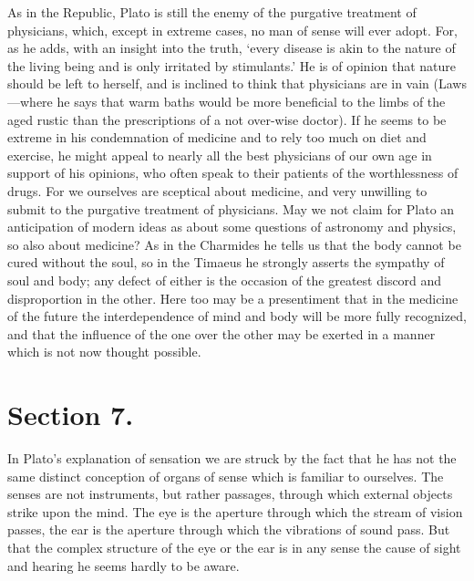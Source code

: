 \documentclass[11pt,letter]{article}
\begin{document}
\par  As in the Republic, Plato is still the enemy of the purgative treatment of physicians, which, except in extreme cases, no man of sense will ever adopt. For, as he adds, with an insight into the truth, ‘every disease is akin to the nature of the living being and is only irritated by stimulants.’ He is of opinion that nature should be left to herself, and is inclined to think that physicians are in vain (Laws—where he says that warm baths would be more beneficial to the limbs of the aged rustic than the prescriptions of a not over-wise doctor). If he seems to be extreme in his condemnation of medicine and to rely too much on diet and exercise, he might appeal to nearly all the best physicians of our own age in support of his opinions, who often speak to their patients of the worthlessness of drugs. For we ourselves are sceptical about medicine, and very unwilling to submit to the purgative treatment of physicians. May we not claim for Plato an anticipation of modern ideas as about some questions of astronomy and physics, so also about medicine? As in the Charmides he tells us that the body cannot be cured without the soul, so in the Timaeus he strongly asserts the sympathy of soul and body; any defect of either is the occasion of the greatest discord and disproportion in the other. Here too may be a presentiment that in the medicine of the future the interdependence of mind and body will be more fully recognized, and that the influence of the one over the other may be exerted in a manner which is not now thought possible.

\par 
\section{
      Section 7.
    }
\par  In Plato’s explanation of sensation we are struck by the fact that he has not the same distinct conception of organs of sense which is familiar to ourselves. The senses are not instruments, but rather passages, through which external objects strike upon the mind. The eye is the aperture through which the stream of vision passes, the ear is the aperture through which the vibrations of sound pass. But that the complex structure of the eye or the ear is in any sense the cause of sight and hearing he seems hardly to be aware.
\end{document}
